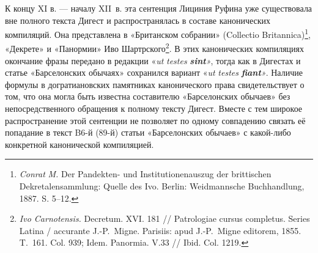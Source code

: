 К концу XI в. --- началу XII~в. эта сентенция Лициния Руфина уже существовала вне полного текста Дигест и распространялась в составе канонических компиляций. Она представлена в «Британском собрании» (Collectio Britannica)\footnote{\emph{Conrat}\emph{ M. }Der Pandekten- und Institutionenauszug der brittischen Dekretalensammlung: Quelle des Ivo. Berlin: Weidmannsche Buchhandlung, 1887. S. 5--12.}, «Декрете» и «Панормии»\emph{ }Иво Шартрского\footnote{\emph{Ivo Carnotensis.} Decretum. XVI. 181 // Patrologiae cursus completus. Series Latina / accurante J.-P.~Migne. Parisiis: apud J.-P.~Migne editorem, 1855. T.~161. Col. 939; Idem. Panormia. V.33 // Ibid. Col. 1219.}. В этих канонических компиляциях окончание фразы передано в редакции «\emph{ut }\emph{testes}\emph{ }\textbf{\emph{sint}}\emph{»}, тогда как в Дигестах и статье «Барселонских обычаях» сохранился вариант «\emph{ut }\emph{testes}\emph{ }\textbf{\emph{fiant}}\emph{»}. Наличие формулы в догратиановских памятниках канонического права свидетельствует о том, что она могла быть известна составителю «Барселонских обычаев» без непосредственного обращения к полному тексту Дигест. Вместе с тем широкое распространение этой сентенции не позволяет по одному совпадению связать её попадание в текст B6-й (89-й) статьи «Барселонских обычаев» с какой-либо конкретной канонической компиляцией.

